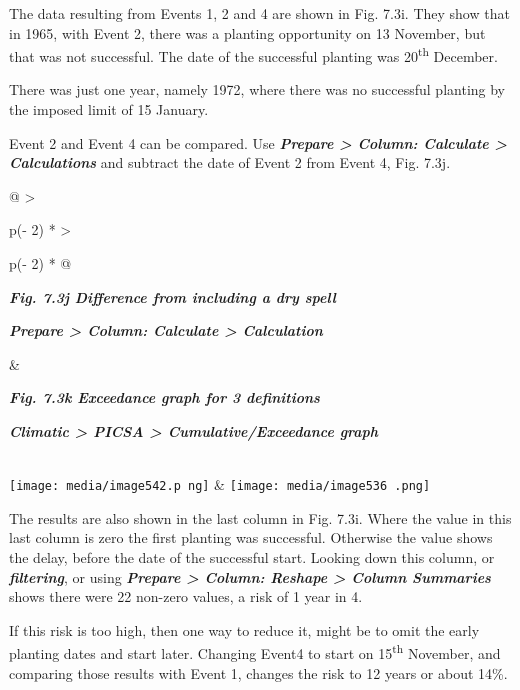 \documentclass[
  letterpaper,
  DIV=11,
  numbers=noendperiod]{scrreprt}
\begin{document}
The data resulting from Events 1, 2 and 4 are shown in Fig. 7.3i. They
show that in 1965, with Event 2, there was a planting opportunity on 13
November, but that was not successful. The date of the successful
planting was 20\textsuperscript{th} December.

There was just one year, namely 1972, where there was no successful
planting by the imposed limit of 15 January.

Event 2 and Event 4 can be compared. Use \textbf{\emph{Prepare
\textgreater{} Column: Calculate \textgreater{} Calculations}} and
subtract the date of Event 2 from Event 4, Fig. 7.3j.

\begin{longtable}[]{@{}
  >{\raggedright\arraybackslash}p{(\columnwidth - 2\tabcolsep) * }
  >{\raggedright\arraybackslash}p{(\columnwidth - 2\tabcolsep) * }@{}}
\toprule\noalign{}
\begin{minipage}[b]{\linewidth}\raggedright
\textbf{\emph{Fig. 7.3j Difference from including a dry spell}}

\textbf{\emph{Prepare \textgreater{} Column: Calculate \textgreater{}
Calculation}}
\end{minipage} & \begin{minipage}[b]{\linewidth}\raggedright
\textbf{\emph{Fig. 7.3k Exceedance graph for 3 definitions}}

\textbf{\emph{Climatic \textgreater{} PICSA \textgreater{}
Cumulative/Exceedance graph}}
\end{minipage} \\
\midrule\noalign{}
\endhead
\bottomrule\noalign{}
\endlastfoot
\texttt{[image: media/image542.p ng]} &
\texttt{[image: media/image536 .png]} \\
\end{longtable}

The results are also shown in the last column in Fig. 7.3i. Where the
value in this last column is zero the first planting was successful.
Otherwise the value shows the delay, before the date of the successful
start. Looking down this column, or \textbf{\emph{filtering}}, or using
\textbf{\emph{Prepare \textgreater{} Column: Reshape \textgreater{}
Column Summaries}} shows there were 22 non-zero values, a risk of 1 year
in 4.

If this risk is too high, then one way to reduce it, might be to omit
the early planting dates and start later. Changing Event4 to start on
15\textsuperscript{th} November, and comparing those results with Event
1, changes the risk to 12 years or about 14\%.
\end{document}
